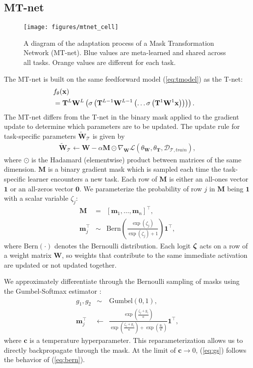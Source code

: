 \documentclass{article}
\newcommand{\calD}{{\mathcal{D}}}
\newcommand{\calT}{{\mathcal{T}}}
\newcommand{\bzeta}{\mbox{\boldmath $\zeta$}}
\newcommand{\bone}{\mathbf{1}}
\newcommand{\bzero}{\mathbf{0}}
\newcommand{\0}{{\bf 0}}
\newcommand{\be}{\begin{eqnarray}}
\newcommand{\ee}{\end{eqnarray}}
\newcommand{\x}{\mathbf{x}}
\newcommand{\W}{\mathbf{W}}
\newcommand{\T}{\mathbf{T}}
\newcommand{\M}{\mathbf{M}}
\newcommand{\logit}{\bzeta}
\newcommand{\logitj}{\zeta_j}
\newcommand{\temp}{\mathbf{c}}
\newcommand{\m}{\mathbf{m}}
\newcommand{\mask}{\M}
\begin{document}
\subsection{MT-net}
\label{subsec:mtnet}

\begin{figure}[ht!]
\centering\texttt{[image: figures/mtnet\_cell]}
\caption{
A diagram of the adaptation process of a Mask Transformation Network (MT-net).
Blue values are meta-learned and shared across all tasks. 
Orange values are different for each task.
}
\end{figure}

The MT-net is built on the same feedforward model (\ref{eq:tmodel}) as the T-net:
\be
\label{eq:mtmodel}
\lefteqn{ f_{\theta}(\x)} \nonumber \\
& =  \T^L \W^L \left( \sigma \left( \T^{L-1} \W^{L-1} \left( \ldots 
\sigma \left(  \T^1 \W^1 \x \right) \right) \right) \right).  
\ee
The MT-net differs from the T-net in the binary mask applied to the gradient update 
to determine which parameters are to be updated.
The update rule for task-specific parameters $\widetilde{\W}_{\calT}$ is given by
\be
\label{eq:mt_update}
\widetilde{\W}_{\calT} \leftarrow \W-\alpha \mask \odot \nabla_{\W}  \mathcal{L}(\theta_{\W}, \theta_{\T},\calD_{\calT,train}),
\ee
where $\odot$ is the Hadamard (elementwise) product between matrices of the same dimension.
$\mask$ is a binary gradient mask which is sampled each time the task-specific learner encounters a new task.
Each row of $\mask$ is either an all-ones vector $\bone$ or an all-zeros vector $\bzero$.
We parameterize the probability of row $j$ in $\mask$ being $\bone$ with a scalar variable $\logitj$:
\be
\mask & = & [\m_1, \ldots, \m_n]^\top, \nonumber \\
\label{eq:bern}
\m_j^{\top}  & \sim & \text{Bern} \left(\frac{\exp \left( \logitj \right)}{\exp \left( \logitj \right)+1} \right) \bone^\top,
\ee
where $\text{Bern} (\cdot)$ denotes the Bernoulli distribution.
Each logit $\logit$ acts on a row of a weight matrix $\W$, so weights that contribute to the same immediate activation are updated or not updated together.

We approximately differentiate through the Bernoulli sampling of masks using the Gumbel-Softmax estimator \cite{Jang2017iclr,Maddison2017iclr}:
\be
g_1, g_2 & \sim & \text{Gumbel}(0, 1), \\
\label{eq:gs}
\m_{j}^{\top} & \leftarrow & \frac{\exp \left(\frac{\logitj + g_1}{\temp} \right)}
{\exp \left(\frac{\logitj + g_1}{\temp}\right)+\exp \left(\frac{g_2}{\temp} \right)} \bone^\top,
\ee
where $\temp$ is a temperature hyperparameter.
This reparameterization allows us to directly backpropagate through the mask.
At the limit of $\temp \rightarrow 0$, (\ref{eq:gs}) follows the behavior of (\ref{eq:bern}).
\end{document}
